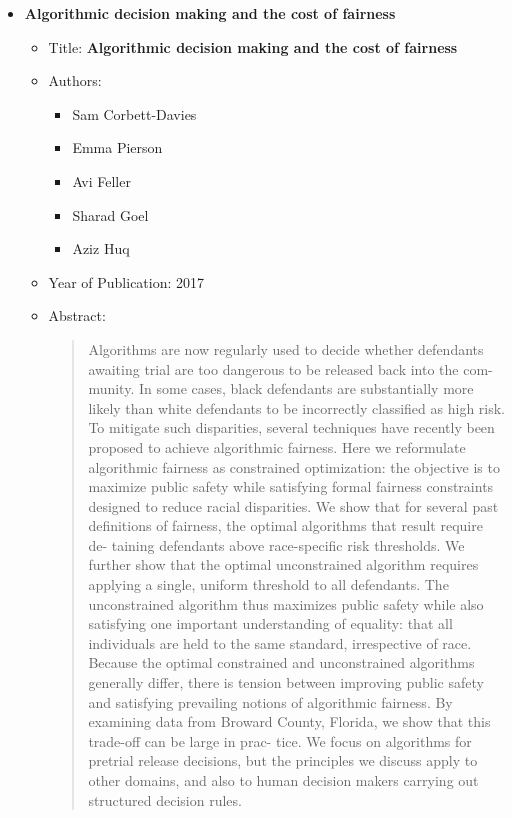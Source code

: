\documentclass{article}
\begin{document}
\begin{itemize}
        \item \textbf{Algorithmic decision making and the cost of fairness}
        \begin{itemize}
            \item Title: \textbf{Algorithmic decision making and the cost of fairness}
            \item Authors:
            \begin{itemize}
                \item Sam Corbett-Davies
                \item Emma Pierson
                \item Avi Feller
                \item Sharad Goel
                \item Aziz Huq
            \end{itemize}
            \item Year of Publication: 2017
            \item Abstract:
            \begin{abstract}
                Algorithms are now regularly used to decide whether defendants
                awaiting trial are too dangerous to be released back into the com-
                munity. In some cases, black defendants are substantially more
                likely than white defendants to be incorrectly classified as high
                risk. To mitigate such disparities, several techniques have recently
                been proposed to achieve algorithmic fairness. Here we reformulate
                algorithmic fairness as constrained optimization: the objective is to
                maximize public safety while satisfying formal fairness constraints
                designed to reduce racial disparities. We show that for several past
                definitions of fairness, the optimal algorithms that result require de- 
                taining defendants above race-specific risk thresholds. We further
                show that the optimal unconstrained algorithm requires applying
                a single, uniform threshold to all defendants. The unconstrained
                algorithm thus maximizes public safety while also satisfying one
                important understanding of equality: that all individuals are held
                to the same standard, irrespective of race. Because the optimal
                constrained and unconstrained algorithms generally differ, there is
                tension between improving public safety and satisfying prevailing
                notions of algorithmic fairness. By examining data from Broward
                County, Florida, we show that this trade-off can be large in prac-
                tice. We focus on algorithms for pretrial release decisions, but the
                principles we discuss apply to other domains, and also to human
                decision makers carrying out structured decision rules.
            \end{abstract}
        \end{itemize}
        

\end{itemize}
\end{document}
